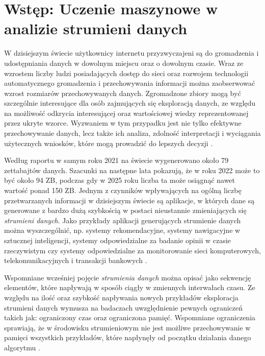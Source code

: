 \chapter{Wstęp: Uczenie maszynowe w analizie strumieni danych}

\noindent W dzisiejszym świecie użytkownicy internetu przyzwyczajeni są do gromadzenia i udostępniania danych w dowolnym miejscu oraz o dowolnym czasie. Wraz ze wzrostem liczby ludzi posiadających dostęp do sieci oraz rozwojem technologii automatycznego gromadzenia i przechowywania informacji można zaobserwować wzrost rozmiarów przechowywanych danych. Zgromadzone zbiory mogą być szczególnie interesujące dla osób zajmujących się eksploracją danych, ze względu na możliwość odkrycia interesującej oraz wartościowej wiedzy reprezentowanej przez ukryte wzorce. Wyzwaniem w tym przypadku jest nie tylko efektywne przechowywanie danych, lecz także ich analiza, zdolność interpretacji i wyciągania użytecznych wniosków, które mogą prowadzić do lepszych decyzji \cite{DBrzezinski}\cite{Prezentacja:ZED}.

Według raportu \cite{Article:BigData} w samym roku 2021 na świecie wygenerowano około 79 zettabajtów danych. Szacunki na następne lata pokazują, że w roku 2022 może to być około 94 ZB, podczas gdy w 2025 roku liczba ta może osiągnąć nawet wartość ponad 150 ZB. Jednym z czynników wpływających na ogólną liczbę przetwarzanych informacji w dzisiejszym świecie są aplikacje, w których dane są generowane z bardzo dużą szybkością w postaci nieustannie zmieniających się \textit{strumieni danych}. Jako przykłady aplikacji generujących strumienie danych można wyszczególnić, np. systemy rekomendacyjne, systemy nawigacyjne w sztucznej inteligencji, systemy odpowiedzialne za badanie opinii w czasie rzeczywistym czy systemy odpowiedzialne za monitorowanie sieci komputerowych, telekomunikacyjnych i transakcji bankowych \cite{DBrzezinski:Prezentacja}.

Wspomniane wcześniej pojęcie \textit{strumienia danych} można opisać jako sekwencję elementów, które napływają w sposób ciągły w zmiennych interwałach czasu. Ze względu na ilość oraz szybkość napływania nowych przykładów eksploracja strumieni danych wymusza na badaczach uwzględnienie pewnych ograniczeń takich jak: ograniczony czas oraz ograniczona pamięć. Wspomniane ograniczenia sprawiają, że w środowisku strumieniowym nie jest możliwe przechowywanie w pamięci wszystkich przykładów, które napłynęły od początku działania danego algorytmu \cite{DBrzezinski}\cite{BrzezPhd2015}.

